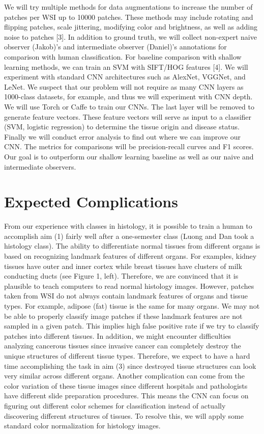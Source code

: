 \documentclass[10pt,twocolumn,letterpaper]{article}
\begin{document}
We will try multiple methods for data augmentations to increase the number of
patches per WSI up to 10000 patches. These methods may include rotating and
flipping patches, scale jittering, modifying color and brightness, as well as
adding noise to patches [3]. In addition to ground truth, we will collect
non-expert naive observer (Jakob)’s and intermediate observer (Daniel)’s
annotations for comparison with human classification. For baseline comparison
with shallow learning methods, we can train an SVM with SIFT/HOG features [4].
We will experiment with standard CNN architectures such as AlexNet, VGGNet,
and LeNet. We suspect that our problem will not require as many CNN layers
as 1000-class datasets, for example, and thus we will experiment with CNN
depth. We will use Torch or Caffe to train our CNNs. The last layer will be
removed to generate feature vectors. These feature vectors will serve as
input to a classifier (SVM, logistic regression) to determine the tissue
origin and disease status. Finally we will conduct error analysis to find
out where we can improve our CNN. The metrics for comparisons will be
precision-recall curves and F1 scores. Our goal is to outperform our shallow
learning baseline as well as our naive and intermediate observers.

\section{Expected Complications}
\label{sec:Expected Complications}

From our experience with classes in histology, it is possible to train a human
to accomplish aim (1) fairly well after a one-semester class (Luong and Dan
took a histology class). The ability to differentiate normal tissues from
different organs is based on recognizing landmark features of different
organs. For examples, kidney tissues have outer and inner cortex while breast
tissues have clusters of milk conducting ducts (see
Figure 1, left).
Therefore, we are convinced that it is plausible to teach computers to read
normal histology images. However, patches taken from WSI do not always
contain landmark features of organs and tissue types. For example, adipose
(fat) tissue is the same for many organs. We may not be able to properly
classify image patches if these landmark features are not sampled in a given
patch. This implies high false positive rate if we try to classify patches
into different tissues. In addition, we might encounter difficulties analyzing
cancerous tissues since invasive cancer can completely destroy the unique
structures of different tissue types. Therefore, we expect to have a hard
time accomplishing the task in aim (3) since destroyed tissue structures can
look very similar across different organs. Another complication can come from
the color variation of these tissue images since different hospitals and
pathologists have different slide preparation procedures. This means the
CNN can focus on figuring out different color schemes for classification
instead of actually discovering different structures of tissues. To resolve
this, we will apply some standard color normalization for histology images.
\end{document}
